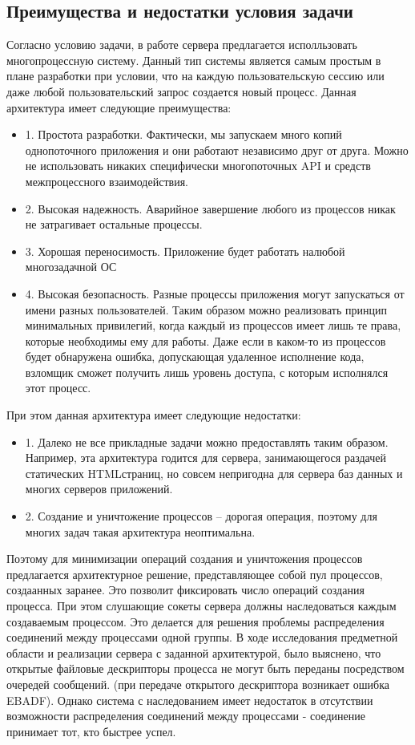 \documentclass[a4paper,12pt]{report}
\begin{document}
\subsection*{Преимущества и недостатки условия задачи}
Согласно условию задачи, в работе сервера предлагается исполльзовать многопроцессную систему. Данный тип системы
является самым простым в плане разработки при условии, что на каждую пользовательскую сессию или даже любой пользовательский запрос
создается новый процесс. Данная архитектура имеет следующие преимущества:
\begin{itemize}
    \item 1. Простота разработки. Фактически, мы запускаем много копий однопоточного приложения и они работают независимо друг от друга. Можно не использовать никаких специфически многопоточных API и средств межпроцессного взаимодействия.
    \item 2. Высокая надежность. Аварийное завершение любого из процессов никак не затрагивает остальные процессы.
    \item 3. Хорошая переносимость. Приложение будет работать налюбой многозадачной ОС
    \item 4. Высокая безопасность. Разные процессы приложения могут запускаться от имени разных пользователей. Таким образом можно реализовать принцип минимальных привилегий, когда каждый из процессов имеет лишь те права, которые необходимы ему для работы. Даже если в каком-то из процессов будет обнаружена ошибка, допускающая удаленное исполнение кода, взломщик сможет получить лишь уровень доступа, с которым исполнялся этот процесс.
\end{itemize}
При этом данная архитектура имеет следующие недостатки:
\begin{itemize}
    \item 1. Далеко не все прикладные задачи можно предоставлять таким образом. Например, эта архитектура годится для сервера, занимающегося раздачей статических HTMLстраниц, но совсем непригодна для сервера баз данных и многих серверов приложений.
    \item 2. Создание и уничтожение процессов – дорогая операция, поэтому для многих задач такая архитектура неоптимальна.
\end{itemize}
Поэтому для минимизации операций создания и уничтожения процессов предлагается архитектурное решение, представляющее собой пул процессов,
создаанных заранее. Это позволит фиксировать число операций создания процесса. При этом слушающие сокеты сервера должны наследоваться каждым создаваемым процессом. Это делается для решения проблемы распределения соединений между процессами одной группы. В ходе исследования предметной области и реализации сервера с заданной архитектурой, было выяснено, что открытые файловые дескрипторы процесса не могут быть переданы посредством очередей сообщений. (при передаче открытого дескриптора возникает ошибка EBADF). Однако система с наследованием имеет недостаток в отсутствии возможности распределения соединений между процессами - соединение принимает тот, кто быстрее успел.
\end{document}
